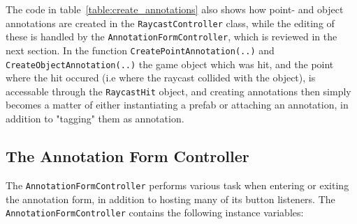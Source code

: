 The code in table~\vref{table:create_annotations} also shows how point- and object annotations are created in the \texttt{Raycast\-Controller} class, while the 
editing of these is handled by the \texttt{Annotation\-Form\-Controller}, which is reviewed in the next section. 
In the function \texttt{Create\-Point\-Annotation(..)} and \texttt{Create\-Object\-Annotation(..)} the game object which was hit, and the point where the
hit occured (i.e where the raycast collided with the object), is accessable through the \texttt{RaycastHit} object, and creating annotations then simply becomes a 
matter of either instantiating a prefab or attaching an annotation, in addition to "tagging" them as annotation. 



\subsection{The Annotation Form Controller}
The \texttt{Annotation\-Form\-Controller} performs various task when entering or exiting the annotation form, in addition to hosting many of its button listeners.
The \texttt{Annotation\-Form\-Controller} contains the following instance variables:

